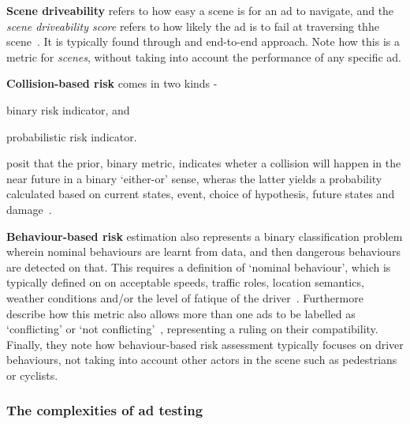 \textbf{Scene driveability} refers to how easy a scene is for an
\acrshort{ad} to navigate, and the \textit{scene driveability score} refers to
how likely the \acrlong{ad} is to fail at traversing thhe
scene~\cite[3140]{safeToDrive}. It is typically found through and end-to-end
approach. Note how this is a metric for \textit{scenes}, without taking into
account the performance of any specific \acrshort{ad}.

\textbf{Collision-based risk} comes in two kinds - \begin{inparaenum}
    \item binary risk indicator, and
    \item probabilistic risk indicator.
\end{inparaenum} \citeauthor{safeToDrive} posit that the prior, binary metric, indicates wheter a
collision will happen in the near future in a binary `either-or' sense, wheras the latter yields a
probability calculated based on current states, event, choice of hypothesis, future states and
damage~\cite[3140]{safeToDrive}.

\textbf{Behaviour-based risk} estimation also represents a binary classification problem wherein
nominal behaviours are learnt from data, and then dangerous behaviours are detected on that. This
requires a definition of `nominal behaviour', which is typically defined on on acceptable speeds,
traffic roles, location semantics, weather conditions and/or the level of fatique of the
driver~\cite[3140]{safeToDrive}. Furthermore \citeauthor{safeToDrive} describe how this metric also
allows more than one \acrshort{ads} to be labelled as `conflicting' or `not
conflicting'~\cite[3140]{safeToDrive}, representing a ruling on their compatibility. Finally, they
note how behaviour-based risk assessment typically focuses on driver behaviours, not taking into
account other actors in the scene such as pedestrians or cyclists.




\subsubsection*{The complexities of \acrshort{ad} testing}\label{sec:adsTestingComplexity}

